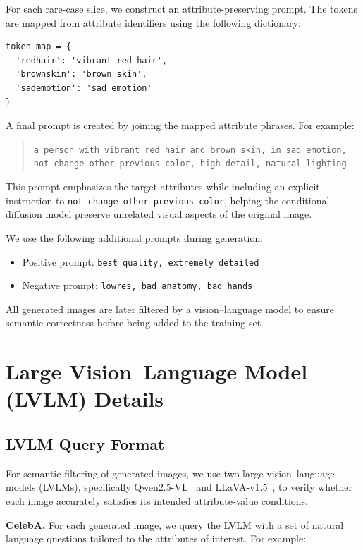 \documentclass[10pt]{article} %
\newcommand{\qwen}{Qwen2.5-VL\xspace}
\newcommand{\llava}{LLaVA-v1.5\xspace}
\begin{document}
For each rare-case slice, we construct an attribute-preserving prompt. The tokens are mapped from attribute identifiers using the following dictionary:
\begin{verbatim}
token_map = {
  'redhair': 'vibrant red hair',
  'brownskin': 'brown skin',
  'sademotion': 'sad emotion'
}

\end{verbatim}

A final prompt is created by joining the mapped attribute phrases. For example:

\begin{quote}
\texttt{a person with vibrant red hair and brown skin, in sad emotion, not change other previous color, high detail, natural lighting}
\end{quote}

This prompt emphasizes the target attributes while including an explicit instruction to \texttt{not change other previous color}, helping the conditional diffusion model preserve unrelated visual aspects of the original image.

We use the following additional prompts during generation:

\begin{itemize}
  \item Positive prompt: \texttt{best quality, extremely detailed}
  \item Negative prompt: \texttt{lowres, bad anatomy, bad hands}
\end{itemize}

All generated images are later filtered by a vision--language model to ensure semantic correctness before being added to the training set.

\section{Large Vision--Language Model (LVLM) Details}
\label{app:lvlm-details}

\subsection{LVLM Query Format}
For semantic filtering of generated images, we use two large vision--language models (LVLMs), specifically \qwen~\citep{bai2025qwen25vl} and \llava~\citep{liu2023improvedllava}, to verify whether each image accurately satisfies its intended attribute-value conditions.

\textbf{CelebA.} For each generated image, we query the LVLM with a set of natural language questions tailored to the attributes of interest. For example:
\end{document}

